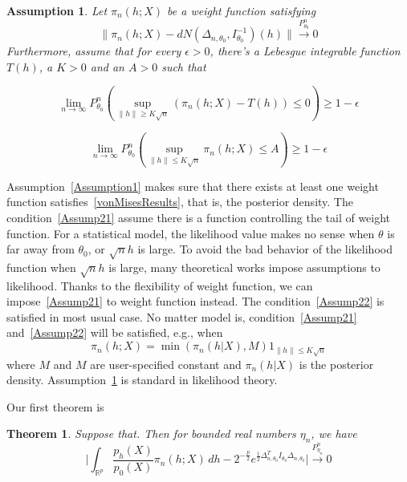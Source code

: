 \documentclass[3p]{elsarticle}
\theoremstyle{plain}
\newtheorem{theorem}{\quad\quad Theorem}
\newtheorem{assumption}{\quad\quad Assumption}
\theoremstyle{definition}
\theoremstyle{remark}
\begin{document}
\begin{assumption}\label{Assumption3}
        Let $\pi_n(h;X)$ be a weight function satisfying 
        \begin{equation}\label{vonMisesResults}
            \|\pi_n(h;X)-dN(\Delta_{n,\theta_0},I_{\theta_0}^{-1})(h)\|\overset{P_{\theta_0}^n}{\to}0
        \end{equation}
Furthermore, assume that for every $\epsilon>0$, there's a Lebesgue integrable function $T(h)$, a $K>0$ and an $A>0$ such that 

    \begin{equation}\label{Assump31}
    \lim_{n\to \infty}P_{\theta_0}^n(\sup_{\|h\|\geq K\sqrt{n}}(\pi_n(h;X)-T(h))\leq 0)\geq 1-\epsilon
\end{equation}

        \begin{equation}\label{Assump32}
            \lim_{n\to \infty} P_{\theta_0}^n(\sup_{\|h\|\leq K\sqrt{n}} \pi_n(h;X)\leq A)\geq 1-\epsilon
        \end{equation}
\end{assumption}


Assumption~\ref{Assumption1} makes sure that there exists at least one weight function satisfies~\ref{vonMisesResults}, that is, the posterior density.
The condition~\ref{Assump21} assume there is a function controlling the tail of weight function. For a statistical model, the likelihood value makes no sense when $\theta$ is far away from $\theta_0$, or $\sqrt{n}h$ is large. To avoid the bad behavior of the likelihood function when $\sqrt{n}h$ is large, many theoretical works impose assumptions to likelihood. Thanks to the flexibility of weight function, we can impose~\ref{Assump21} to weight function instead. The condition~\ref{Assump22} is
satisfied in most usual case. No matter model is, condition~\ref{Assump21} and~\ref{Assump22} will be
satisfied, e.g., when 
\begin{equation}
    \pi_n(h;X)=\min(\pi_n(h|X),M) 1_{\|h\|\leq K\sqrt{n}}
\end{equation}
where $M$ and $M$ are user-specified constant and $\pi_n(h|X)$ is the posterior density.
Assumption~\ref{Assumption3} is standard in likelihood theory.

Our first theorem is
\begin{theorem}\label{theoremMain}
    Suppose that. Then for bounded real numbers $\eta_n$, we have
    \begin{equation}
        \Big|\int_{\mathbb{R}^{p}}\frac{p_h(X)}{p_0(X)}\pi_n(h;X)\,dh-
        2^{-\frac{p}{2}}e^{\frac{1}{2}\Delta_{n,\theta_0}^T I_{\theta_0}\Delta_{n,\theta_0}}
        \Big|\xrightarrow{P_{\eta_n}^n}0
    \end{equation}
\end{theorem}
\end{document}
